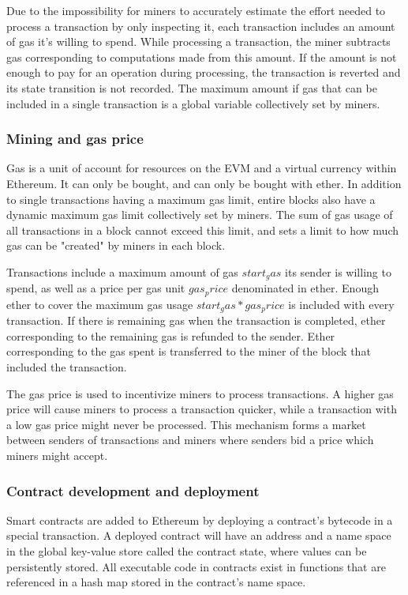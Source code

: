 Due to the impossibility for miners to accurately estimate the effort needed to process a transaction by only inspecting it, each transaction includes an amount of gas it's willing to spend. While processing a transaction, the miner subtracts gas corresponding to computations made from this amount. If the amount is not enough to pay for an operation during processing, the transaction is reverted and its state transition is not recorded. The maximum amount if gas that can be included in a single transaction is a global variable collectively set by miners. 

\subsubsection{Mining and gas price}
Gas is a unit of account for resources on the EVM and a virtual currency within Ethereum. It can only be bought, and can only be bought with ether. In addition to single transactions having a maximum gas limit, entire blocks also have a dynamic maximum gas limit collectively set by miners. The sum of gas usage of all transactions in a block cannot exceed this limit, and sets a limit to how much gas can be "created" by miners in each block. 

Transactions include a maximum amount of gas $start_gas$ its sender is willing to spend, as well as a price per gas unit $gas_price$ denominated in ether. Enough ether to cover the maximum gas usage $start_gas * gas_price$ is included with every transaction. If there is remaining gas when the transaction is completed, ether corresponding to the remaining gas is refunded to the sender. Ether corresponding to the gas spent is transferred to the miner of the block that included the transaction.

The gas price is used to incentivize miners to process transactions. A higher gas price will cause miners to process a transaction quicker, while a transaction with a low gas price might never be processed. This mechanism forms a market between senders of transactions and miners where senders bid a price which miners might accept. 

\subsubsection{Contract development and deployment}
Smart contracts are added to Ethereum by deploying a contract's bytecode in a special transaction. A deployed contract will have an address and a name space in the global key-value store called the contract state, where values can be persistently stored. All executable code in contracts exist in functions that are referenced in a hash map stored in the contract's name space.

